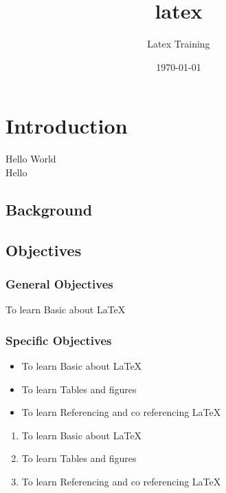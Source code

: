 \documentclass[titlepage]{article}
\title{latex}
\author{Latex Training}
\date{\today}
\begin{document}
\maketitle
\tableofcontents
\newpage
\pagestyle{empty}

\section[Intro]{Introduction}%

Hello World\\
Hello\\
\lipsum[1]
\newpage
\begin{landscape}%
\section{Background}
\lipsum[1]
\end{landscape}
\subsection{Objectives}
\lipsum[2]
\subsubsection{General Objectives}
To learn Basic about \LaTeX
\subsubsection{Specific Objectives}

\begin{itemize}%
\item To learn Basic about \LaTeX 
\item To learn Tables and figures 
\item To learn Referencing and co referencing \LaTeX \\ 
\end{itemize}
\begin{enumerate}
\item To learn Basic about \LaTeX 
\item To learn Tables and figures 
\item To learn Referencing and co referencing \LaTeX 
\end{enumerate}

\end{document}
